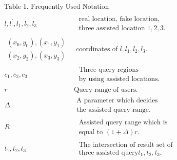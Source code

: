 \documentclass[a4paper,fleqn]{cas-dc}
\begin{document}
\[
\begin{aligned}
   \begin{aligned}
    &\text { Table 1. Frequently Used Notation }\\
    &\begin{array}{cc}
        \hline 
        
            l, l^{\prime}, l_{1}, l_{2}, l_{3} & \begin{array}{c}
            \text { real location, fake location, } \\
            \text { three assisted location } 1,2,3 .
            \end{array} \\
            
            \begin{array}{c}
            \left(x_{0}, y_{0}\right),\left(x_{1}, y_{1}\right) \\  \left(x_{2}, y_{2}\right),\left(x_{3}, y_{3}\right)
            \end{array} & \text { coordinates of } l, l_{1}, l_{2}, l_{3} . \\
            
            c_{1}, c_{2}, c_{3} & \begin{array}{c}
            \text{ Three query regions} \\ \text{ by using assisted locations.}
            \end{array} \\
            
             r & \text{Query range of users.} \\
            
            \Delta & \begin{array}{c}
                \text{A parameter which decides} \\ \text{the assisted query range.}
            \end{array} \\
            
            R &  \begin{array}{c}
                \text { Assisted query range which is } \\ \text { equal to } (1+\Delta)r. 
            \end{array}  \\
            
            t_{1}, t_{2}, t_{3} &  \begin{array}{c}
                \text { The intersection of result set of } \\ \text { three assisted query}  t_{1}, t_{2}, t_{3} . 
            \end{array} \\
            

\end{array}
\end{aligned}
\end{aligned}\]
\end{document}
